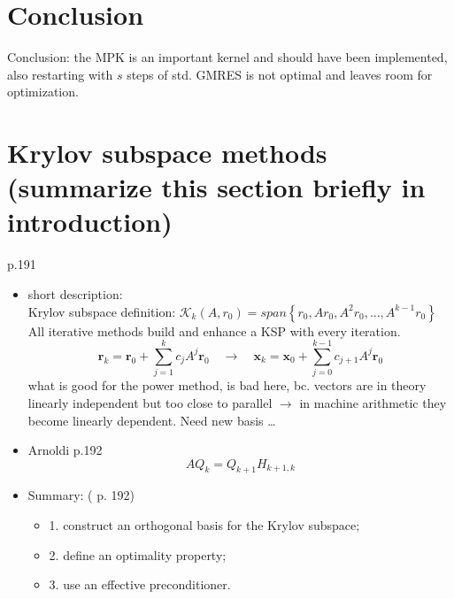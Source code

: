 \documentclass{scrartcl}
\numberwithin{equation}{section}
\begin{document}
\section{Conclusion}
Conclusion: the MPK is an important kernel and should have been implemented, also restarting with $s$ steps of std. GMRES is not optimal and leaves room for optimization.

\iffalse
\section*{Krylov subspace methods (summarize this section briefly in introduction)}

\cite{Ascher:2011:FCN:2031413} p.191\\
\begin{itemize}
\item short description:\\
Krylov subspace definition: $\mathcal{K}_k(A, r_0) = span \left\{ r_0, Ar_0, A^2r_0,\ldots,A^{k-1}r_0 \right\}$\\

All iterative methods build and enhance a KSP with every iteration.
\begin{equation*}
\textbf{r}_k = \textbf{r}_0 + \sum_{j=1}^{k} c_jA^j\textbf{r}_0 \quad \to \quad \textbf{x}_k = \textbf{x}_0 + \sum_{j=0}^{k-1} c_{j+1}A^j\textbf{r}_0
\end{equation*}
what is good for the power method, is bad here, bc. vectors are in theory linearly independent but too close to parallel $\to$ in machine arithmetic they become linearly dependent. Need new basis \ldots 
\item Arnoldi \cite{Ascher:2011:FCN:2031413} p.192
\begin{equation*}
AQ_k = Q_{k+1}H_{k+1,k}
\end{equation*}
\item Summary: (\cite{Ascher:2011:FCN:2031413} p. 192)
	\begin{itemize}
	\item 1. construct an orthogonal basis for the Krylov subspace;
	\item 2. define an optimality property;
	\item 3. use an effective preconditioner.
	\end{itemize}
\end{itemize}
\end{document}

